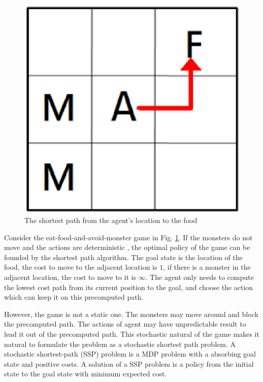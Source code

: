 \begin{figure}[h]
    \centering
    \begin{minipage}[t]{0.3\linewidth}
        \centering
        \includegraphics[width=\textwidth] {./figures/monster_plan.eps}
    \end{minipage}
    \caption{The shortest path from the agent's location to the food}
    \label{fig:monster_plan}
\end{figure}
Consider the eat-food-and-avoid-monster game in Fig. \ref{fig:monster_plan}. If the monsters do not move and the actions are deterministic
, the optimal policy of the game can be founded by the shortest path algorithm. The goal state is the location of the food,
the cost to move to the adjacent location is $1$, if there is a monster in the adjacent location, the cost 
to move to it is $\infty$. The agent only needs to compute the lowest cost path from its current position to the goal,
and choose the action which can keep it on this precomputed path.

However, the game is not a static one. The monsters may move around and block the precomputed path. The actions of
agent may have unpredictable result to lead it out of the precomputed path.
This stochastic natural of the game makes it natural to formulate the problem as a stochastic shortest path
problem. A stochastic shortest-path (SSP) problem is a MDP problem with a absorbing goal state and positive costs.
A solution of a SSP problem is a policy from the initial state to the goal state with minimum expected cost.

